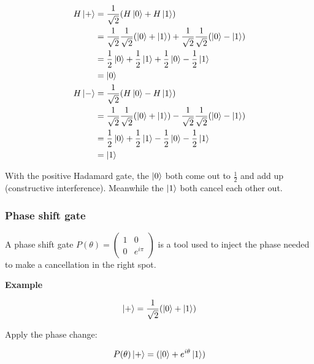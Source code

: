 \documentclass[11pt]{article}
\begin{document}
\begin{align*}
	H\ket{+} & = \frac{1}{\sqrt2}(H\ket{0} + H\ket{1})                                                                         \\
	         & = \frac{1}{\sqrt2} \frac{1}{\sqrt2} (\ket{0} + \ket{1}) + \frac{1}{\sqrt2} \frac{1}{\sqrt2} (\ket{0} - \ket{1}) \\
	         & = \frac12\ket{0} + \frac12\ket{1} + \frac12\ket{0} - \frac12\ket{1}                                             \\
	         & = \ket{0}                                                                                                       \\
	H\ket{-} & = \frac{1}{\sqrt2}(H\ket{0} - H\ket{1})                                                                         \\
	         & = \frac{1}{\sqrt2} \frac{1}{\sqrt2} (\ket{0} + \ket{1}) - \frac{1}{\sqrt2} \frac{1}{\sqrt2} (\ket{0} - \ket{1}) \\
	         & = \frac12\ket{0} + \frac12\ket{1} - \frac12\ket{0} - \frac12\ket{1}                                             \\
	         & = \ket{1}
\end{align*}

With the positive Hadamard gate, the $\ket{0}$ both come out to $\frac12$ and add up (constructive interference). Meanwhile the $\ket{1}$ both cancel each other out.

\subsubsection{Phase shift gate}

A phase shift gate $P(\theta) = \begin{pmatrix} 1 & 0 \\ 0 & e^{i\pi} \end{pmatrix}$ is a tool used to inject the phase needed to make a cancellation in the right spot.

\vspace{11pt}

\textbf{Example}

\begin{equation*}
	\ket{+} = \frac{1}{\sqrt2}(\ket{0} + \ket{1})
\end{equation*}

Apply the phase change:

\begin{equation*}
	P(\theta)\ket{+} = (\ket{0} + e^{i\theta}\ket{1})
\end{equation*}
\end{document}
